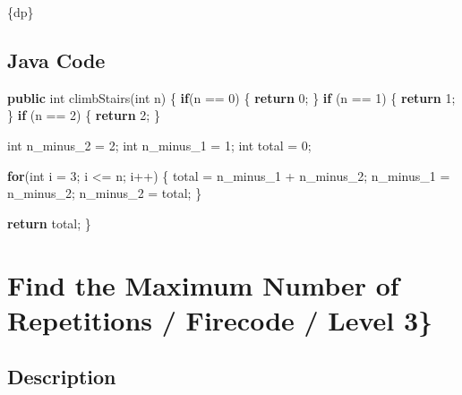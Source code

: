 \documentclass[]{book}
\newenvironment{Shaded}{\begin{snugshade}}{\end{snugshade}}
\newcommand{\DataTypeTok}[1]{\textcolor[rgb]{0.13,0.29,0.53}{#1}}
\newcommand{\DecValTok}[1]{\textcolor[rgb]{0.00,0.00,0.81}{#1}}
\newcommand{\FunctionTok}[1]{\textcolor[rgb]{0.00,0.00,0.00}{#1}}
\newcommand{\KeywordTok}[1]{\textcolor[rgb]{0.13,0.29,0.53}{\textbf{#1}}}
\newcommand{\NormalTok}[1]{#1}
\begin{document}
\{dp\}

\hypertarget{java-code-26}{%
\subsection{Java Code}\label{java-code-26}}

\begin{Shaded}
\begin{Highlighting}[]
\KeywordTok{public} \DataTypeTok{int} \FunctionTok{climbStairs}\NormalTok{(}\DataTypeTok{int}\NormalTok{ n) \{}
    \KeywordTok{if}\NormalTok{(n == }\DecValTok{0}\NormalTok{) \{}
        \KeywordTok{return} \DecValTok{0}\NormalTok{;}
\NormalTok{    \}}
    \KeywordTok{if}\NormalTok{ (n == }\DecValTok{1}\NormalTok{) \{}
        \KeywordTok{return} \DecValTok{1}\NormalTok{;}
\NormalTok{    \}}
    \KeywordTok{if}\NormalTok{ (n == }\DecValTok{2}\NormalTok{) \{}
        \KeywordTok{return} \DecValTok{2}\NormalTok{;}
\NormalTok{    \}}

    \DataTypeTok{int}\NormalTok{ n_minus_}\DecValTok{2}\NormalTok{ = }\DecValTok{2}\NormalTok{;}
    \DataTypeTok{int}\NormalTok{ n_minus_}\DecValTok{1}\NormalTok{ = }\DecValTok{1}\NormalTok{;}
    \DataTypeTok{int}\NormalTok{ total = }\DecValTok{0}\NormalTok{;}

    \KeywordTok{for}\NormalTok{(}\DataTypeTok{int}\NormalTok{ i = }\DecValTok{3}\NormalTok{; i <= n; i++) \{}
\NormalTok{        total = n_minus_}\DecValTok{1}\NormalTok{ + n_minus_}\DecValTok{2}\NormalTok{;}
\NormalTok{        n_minus_}\DecValTok{1}\NormalTok{ = n_minus_}\DecValTok{2}\NormalTok{;}
\NormalTok{        n_minus_}\DecValTok{2}\NormalTok{ = total;}
\NormalTok{    \}}

    \KeywordTok{return}\NormalTok{ total;}
\NormalTok{\}}
\end{Highlighting}
\end{Shaded}

\hypertarget{find-the-maximum-number-of-repetitions-firecode-level-3}{%
\section{Find the Maximum Number of Repetitions / Firecode / Level 3\}}\label{find-the-maximum-number-of-repetitions-firecode-level-3}}

\hypertarget{description-31}{%
\subsection{Description}\label{description-31}}
\end{document}
